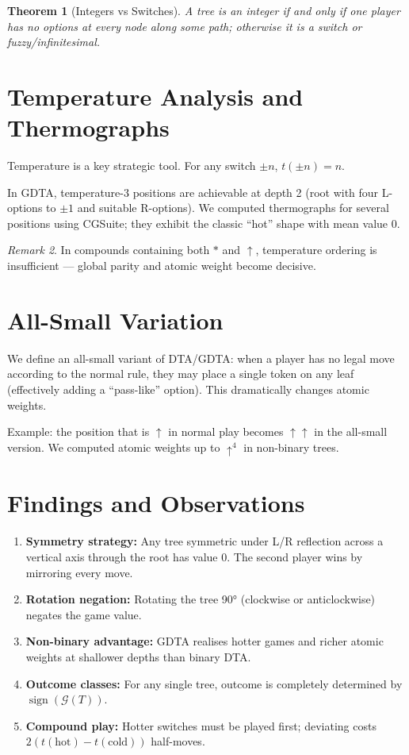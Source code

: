 \documentclass[10pt,a4paper,twocolumn]{article}
\newcommand{\Gv}[1]{\mathcal{G}(#1)}
\newcommand{\tmp}[1]{t\!\left(#1\right)}
\theoremstyle{plain}
\newtheorem{theorem}{Theorem}[section]
\theoremstyle{definition}
\theoremstyle{remark}
\newtheorem{remark}[theorem]{Remark}
\begin{document}
\begin{theorem}[Integers vs Switches]
A tree is an integer if and only if one player has no options at every node along some path; otherwise it is a switch or fuzzy/infinitesimal.
\end{theorem}

\section{Temperature Analysis and Thermographs}

Temperature is a key strategic tool. For any switch \(\pm n\), \(\tmp{\pm n} = n\).

In GDTA, temperature-3 positions are achievable at depth 2 (root with four L-options to \(\pm 1\) and suitable R-options). We computed thermographs for several positions using CGSuite; they exhibit the classic “hot” shape with mean value 0.

\begin{remark}
In compounds containing both \(*\) and \(\uparrow\), temperature ordering is insufficient — global parity and atomic weight become decisive.
\end{remark}

\section{All-Small Variation}

We define an all-small variant of DTA/GDTA: when a player has no legal move according to the normal rule, they may place a single token on any leaf (effectively adding a “pass-like” option). This dramatically changes atomic weights.

Example: the position that is \(\uparrow\) in normal play becomes \(\uparrow\uparrow\) in the all-small version. We computed atomic weights up to \(\uparrow^4\) in non-binary trees.

\section{Findings and Observations}

\begin{enumerate}
\item \textbf{Symmetry strategy:} Any tree symmetric under L/R reflection across a vertical axis through the root has value 0. The second player wins by mirroring every move.
\item \textbf{Rotation negation:} Rotating the tree 90° (clockwise or anticlockwise) negates the game value.
\item \textbf{Non-binary advantage:} GDTA realises hotter games and richer atomic weights at shallower depths than binary DTA.
\item \textbf{Outcome classes:} For any single tree, outcome is completely determined by \(\operatorname{sign}(\Gv{T})\).
\item \textbf{Compound play:} Hotter switches must be played first; deviating costs \(2(\tmp{\text{hot}}-\tmp{\text{cold}})\) half-moves.
\end{enumerate}
\end{document}
